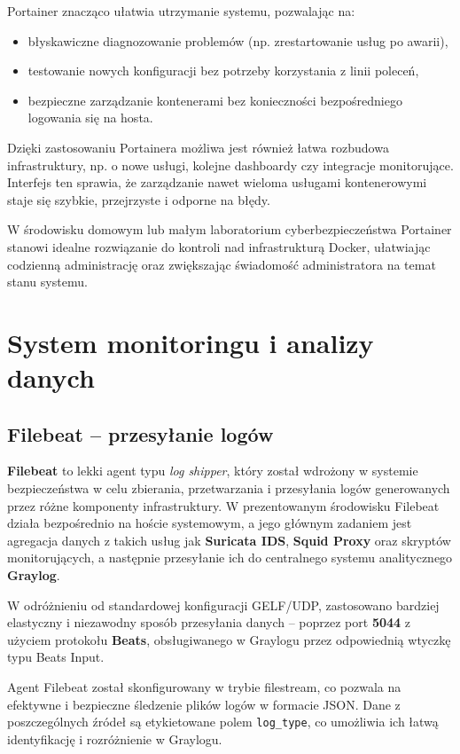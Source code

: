 \documentclass[
    left=2.5cm,         %
    right=2.5cm,        %
    top=2.5cm,          %
    bottom=3cm,         %
    bindingoffset=6mm,  %
    nohyphenation=true %
]{eiti/eiti-thesis} %
\begin{document}
Portainer znacząco ułatwia utrzymanie systemu, pozwalając na:
\begin{itemize}
    \item błyskawiczne diagnozowanie problemów (np. zrestartowanie usług po awarii),
    \item testowanie nowych konfiguracji bez potrzeby korzystania z linii poleceń,
    \item bezpieczne zarządzanie kontenerami bez konieczności bezpośredniego logowania się na hosta.
\end{itemize}

Dzięki zastosowaniu Portainera możliwa jest również łatwa rozbudowa infrastruktury, np. o nowe usługi, kolejne dashboardy czy integracje monitorujące. Interfejs ten sprawia, że zarządzanie nawet wieloma usługami kontenerowymi staje się szybkie, przejrzyste i odporne na błędy.

W środowisku domowym lub małym laboratorium cyberbezpieczeństwa Portainer stanowi idealne rozwiązanie do kontroli nad infrastrukturą Docker, ułatwiając codzienną administrację oraz zwiększając świadomość administratora na temat stanu systemu.


\newpage 
\section{System monitoringu i analizy danych}

\subsection{Filebeat – przesyłanie logów}

\textbf{Filebeat}\cite{filebeat-docs} to lekki agent typu \textit{log shipper}, który został wdrożony w systemie bezpieczeństwa w celu zbierania, przetwarzania i przesyłania logów generowanych przez różne komponenty infrastruktury. W prezentowanym środowisku Filebeat działa bezpośrednio na hoście systemowym\cite{config-filebeat}, a jego głównym zadaniem jest agregacja danych z takich usług jak \textbf{Suricata IDS}, \textbf{Squid Proxy} oraz skryptów monitorujących, a następnie przesyłanie ich do centralnego systemu analitycznego \textbf{Graylog}.

W odróżnieniu od standardowej konfiguracji GELF/UDP, zastosowano bardziej elastyczny i niezawodny sposób przesyłania danych – poprzez port \textbf{5044} z użyciem protokołu \textbf{Beats}, obsługiwanego w Graylogu przez odpowiednią wtyczkę typu Beats Input.

Agent Filebeat został skonfigurowany w trybie filestream, co pozwala na efektywne i bezpieczne śledzenie plików logów w formacie JSON. Dane z poszczególnych źródeł są etykietowane polem \texttt{log\_type}, co umożliwia ich łatwą identyfikację i rozróżnienie w Graylogu.
\end{document}
